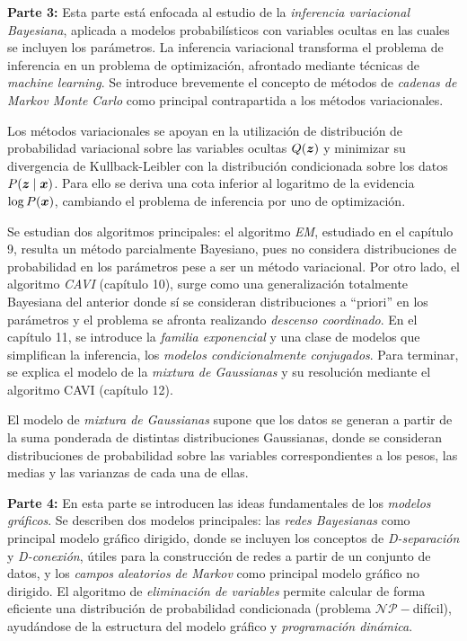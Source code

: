 \textbf{Parte 3:} Esta parte está enfocada al estudio de la \emph{inferencia variacional Bayesiana}, aplicada a modelos probabilísticos con variables ocultas en las cuales se incluyen los parámetros. La inferencia variacional transforma el problema de inferencia en un problema de optimización, afrontado mediante técnicas de \emph{machine learning}. Se introduce brevemente el concepto de métodos de \emph{cadenas de Markov Monte Carlo} como principal contrapartida a los métodos variacionales.

Los métodos variacionales se apoyan en la utilización de distribución de probabilidad variacional sobre las variables ocultas \(Q(\bm{z})\) y minimizar su divergencia de Kullback-Leibler con la distribución condicionada sobre los datos \(P(\bm{z} \mid \bm{x})\). Para ello se deriva una cota inferior al logaritmo de la evidencia \(\log P(\bm{x})\), cambiando el problema de inferencia por uno de optimización.

Se estudian dos algoritmos principales: el algoritmo \emph{EM}, estudiado en el capítulo 9, resulta un método parcialmente Bayesiano, pues no considera distribuciones de probabilidad en los parámetros pese a ser un método variacional. Por otro lado, el algoritmo \emph{CAVI} (capítulo 10), surge como una generalización totalmente Bayesiana del anterior donde sí se consideran distribuciones a ``priori'' en los parámetros y el problema se afronta realizando \emph{descenso coordinado}. En el capítulo 11, se introduce la \emph{familia exponencial} y una clase de modelos que simplifican la inferencia, los \emph{modelos condicionalmente conjugados}. Para terminar, se explica el modelo de la \emph{mixtura de Gaussianas} y su resolución mediante el algoritmo CAVI (capítulo 12).

El modelo de \emph{mixtura de Gaussianas} supone que los datos se generan a partir de la suma ponderada de distintas distribuciones Gaussianas, donde se consideran distribuciones de probabilidad sobre las variables correspondientes a los pesos, las medias y las varianzas de  cada una de ellas.

\textbf{Parte 4:} En esta parte se introducen las ideas fundamentales de los \emph{modelos gráficos}. Se describen dos modelos principales: las \emph{redes Bayesianas} como principal modelo gráfico dirigido, donde se incluyen los conceptos de \emph{D-separación} y \emph{D-conexión}, útiles para la construcción de redes a partir de un conjunto de datos, y los \emph{campos aleatorios de Markov} como principal modelo gráfico no dirigido. El algoritmo de \emph{eliminación de variables} permite calcular de forma eficiente una distribución de probabilidad condicionada (problema \(\mathcal{NP}-\)difícil), ayudándose de la estructura del modelo gráfico y \emph{programación dinámica}.


